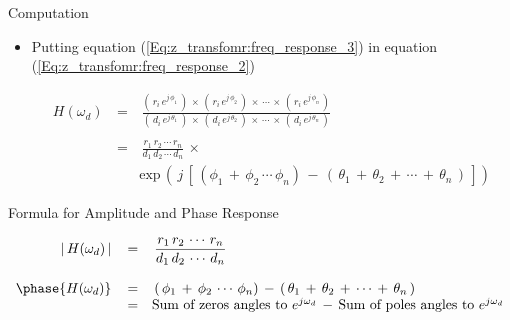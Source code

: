 \documentclass{beamer}
\begin{document}
\begin{frame}[t,allowframebreaks]{Computation}
\begin{itemize}
\begin{equation}
\begin{array}{rcl}
r_i \, e^{j \, \phi_i} \, = \, e^{j \, \omega_d} \, - \, z_i \\
d_i \, e^{j \, \theta_i} \, =  e^{j \, \omega_d} \, - \, p_i 
\end{array}
\label{Eq:z_transfomr:freq_response_3}
\end{equation}

\item Putting equation (\autoref{Eq:z_transfomr:freq_response_3}) in equation (\autoref{Eq:z_transfomr:freq_response_2})

\begin{equation}
\begin{array}{rcl}
H(\omega_d) \, &=& \, \displaystyle\frac{( \, r_i \, e^{j \, \phi_1} \,) \, \times \, ( \,  r_i \, e^{j \, \phi_2}\,) \, \times \, \cdots \, \times \, ( \, r_i \, e^{j \, \phi_n} \,)}{( \,  d_i \, e^{j \, \theta_1} \,) \, \times \,( \, d_i \, e^{j \, \theta_2} \,) \, \times \, \cdots \, \times \,( \,  d_i \, e^{j \, \theta_n} \,)} \\ \\
		&=& \, \displaystyle\frac{r_1 \, r_2 \, \cdots \, r_n}{d_1 \, d_2 \, \cdots \, d_n} \, \times \,  \\
		&&  \text{exp} \, (\, j \, \left[ \,  ( \phi_1 \, + \, \phi_2 \, \cdots \, \phi_n ) \, - \, (\, \theta_1 \, + \, \theta_2 \, + \, \cdots \, + \, \theta_n \,) \,\right] )
\end{array}
\end{equation}

\end{itemize}


\end{frame}

\begin{frame}[t]{Formula for Amplitude and Phase Response}

\begin{equation}
\begin{array}{rcl}
\lvert\, H(\omega_d) \, \rvert \, &=& \, \displaystyle\frac{r_1 \, r_2 \, \cdots \, r_n}{d_1 \, d_2 \, \cdots \, d_n} \\ \\
 \phase{H(\omega_d)} \, &=& \, (\, \phi_1 \, + \, \phi_2 \, \cdots \, \phi_n ) \, - \, (\, \theta_1 \, + \, \theta_2 \, + \, \cdots \, + \, \theta_n \,) \\
 		&=& \text{Sum of zeros angles to } e^{j \omega_d} \, - \,  \text{Sum of poles angles to } e^{j \omega_d}
\end{array}
\end{equation}

\end{frame}
\end{document}
